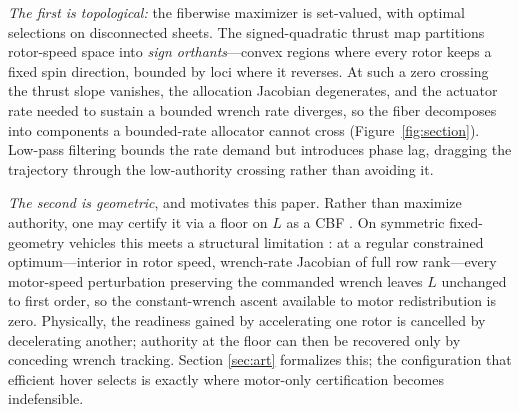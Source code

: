 \documentclass[letter, 10 pt, journal, twoside]{IEEEtran}
\theoremstyle{compact}
\begin{document}
\emph{The first is topological:} the fiberwise maximizer is set-valued, with optimal selections on disconnected sheets. The signed-quadratic thrust map partitions rotor-speed space into \emph{sign orthants}---convex regions where every rotor keeps a fixed spin direction, bounded by loci where it reverses. At such a zero crossing the thrust slope vanishes, the allocation Jacobian degenerates, and the actuator rate needed to sustain a bounded wrench rate diverges, so the fiber decomposes into components a bounded-rate allocator cannot cross (Figure~\ref{fig:section}). Low-pass filtering bounds the rate demand but introduces phase lag, dragging the trajectory through the low-authority crossing rather than avoiding it.
 
\emph{The second is geometric}, and motivates this paper. Rather than maximize authority, one may certify it via a floor on $L$ as a \acf{CBF} \cite{Kurtz2021, Zhang2024}. On symmetric fixed-geometry vehicles this meets a structural limitation \cite{Silano2026Readiness}: at a regular constrained optimum---interior in rotor speed, wrench-rate Jacobian of full row rank---every motor-speed perturbation preserving the commanded wrench leaves $L$ unchanged to first order, so the constant-wrench ascent available to motor redistribution is zero. Physically, the readiness gained by accelerating one rotor is cancelled by decelerating another; authority at the floor can then be recovered only by conceding wrench tracking. Section \ref{sec:art} formalizes this; the configuration that efficient hover selects is exactly where motor-only certification becomes indefensible.
\end{document}
